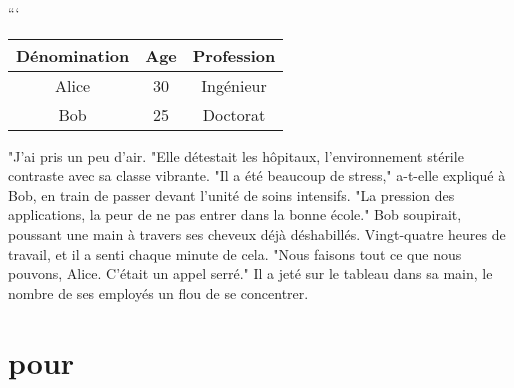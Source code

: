 \documentclass{article}
\begin{document}
```
\begin{tabular}{ccc}
    \hline
    Dénomination & Age & Profession \\
    \hline
    Alice & 30 & Ingénieur \\
    Bob & 25 & Doctorat \\
    \hline
\end{tabular}
"J'ai pris un peu d'air. "Elle détestait les hôpitaux, l'environnement stérile contraste avec sa classe vibrante. "Il a été beaucoup de stress," a-t-elle expliqué à Bob, en train de passer devant l'unité de soins intensifs. "La pression des applications, la peur de ne pas entrer dans la bonne école." Bob soupirait, poussant une main à travers ses cheveux déjà déshabillés. Vingt-quatre heures de travail, et il a senti chaque minute de cela. "Nous faisons tout ce que nous pouvons, Alice. C'était un appel serré." Il a jeté sur le tableau dans sa main, le nombre de ses employés un flou de se concentrer.

\section{pour}
\end{document}
